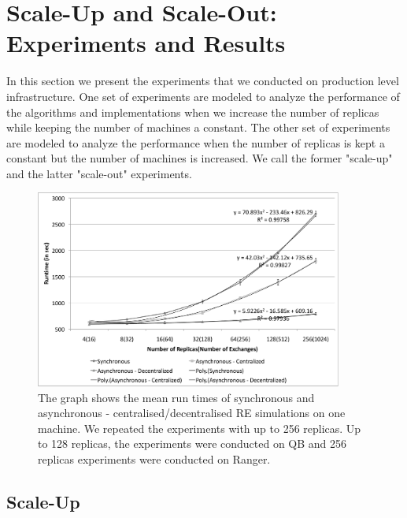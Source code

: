 \documentclass{rspublic}
\begin{document}
\section{Scale-Up and Scale-Out: Experiments and Results}

In this section we present the experiments that we conducted on production level infrastructure. One set of experiments are modeled to analyze the performance of the algorithms and implementations when we increase the number of replicas while keeping the number of machines a constant. The other set of experiments are modeled to analyze the performance when the number of replicas is kept a constant but the number of machines is increased. We call the former "scale-up" and the latter "scale-out" experiments.

%
\begin{figure}
\centering
\includegraphics[width=0.9\textwidth]{../data/scale_up.pdf}
\caption{\small The graph shows the mean run times of synchronous and
  asynchronous - centralised/decentralised RE simulations on one
  machine. We repeated the experiments with up to 256 replicas. Up to
  128 replicas, the experiments were conducted on QB and 256 replicas
  experiments were conducted on Ranger.}
\label{fig:graph}
\vspace{-1em}
\end{figure}

\subsection{Scale-Up}
\end{document}
